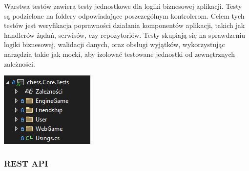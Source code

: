 \documentclass[12pt,a4paper]{article}
\begin{document}
\vspace{0.5cm}
\begin{minipage}[t]{0.45\textwidth}
    \vspace{0pt}
    \raggedright
    Warstwa testów zawiera testy jednostkowe dla logiki biznesowej aplikacji. Testy są podzielone na foldery odpowiadające poszczególnym kontrolerom. Celem tych testów jest weryfikacja poprawności działania komponentów aplikacji, takich jak handlerów żądań, serwisów, czy repozytoriów. Testy skupiają się na sprawdzeniu logiki biznesowej, walidacji danych, oraz obsługi wyjątków, wykorzystując narzędzia takie jak mocki, aby izolować testowane jednostki od zewnętrznych zależności.
\end{minipage}
\hfill
\begin{minipage}[t]{0.45\textwidth}
    \vspace{0pt}
    \centering
    \includegraphics[width=\linewidth]{images/struktura_back_core_tests.png} 
\end{minipage}

\newpage

\subsubsection{REST API}
\end{document}
